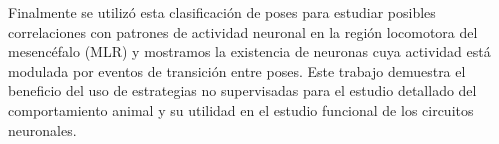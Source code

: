 \begin{resumen}
Finalmente se utilizó esta clasificación de poses para estudiar posibles correlaciones con patrones de actividad neuronal en la región locomotora del mesencéfalo (MLR) y mostramos la existencia de neuronas cuya actividad está modulada por eventos de transición entre poses. Este trabajo demuestra el beneficio del uso de estrategias no supervisadas para el estudio detallado del comportamiento animal y su utilidad en el estudio funcional de los circuitos neuronales.
\end{resumen}
